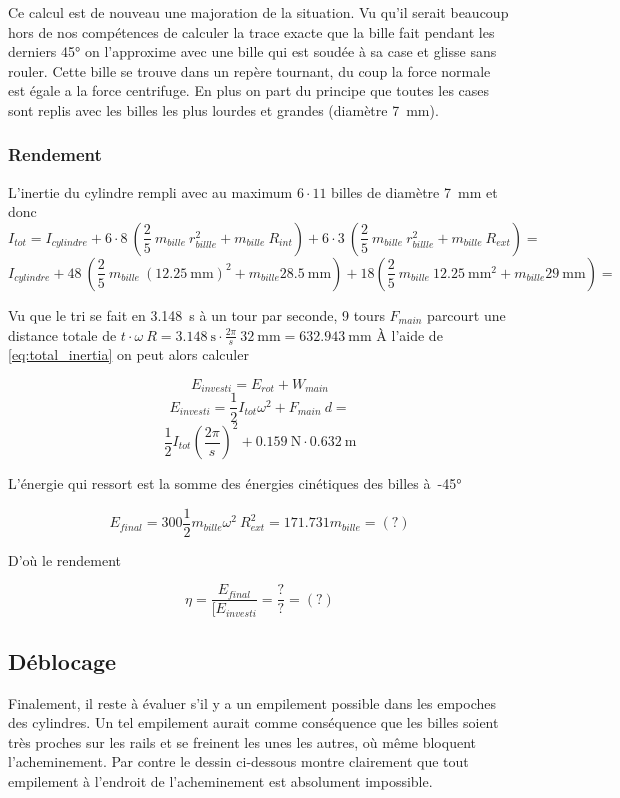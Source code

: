 Ce calcul est de nouveau une majoration de la situation. Vu qu'il serait beaucoup hors de nos compétences de calculer la trace exacte que la bille fait pendant les derniers \ang{45} on l'approxime avec une bille qui est soudée à sa case et glisse sans rouler. Cette bille se trouve dans un repère tournant, du coup la force normale est égale a la force centrifuge. En plus on part du principe que toutes les cases sont replis avec les billes les plus lourdes et grandes (diamètre \SI{7}{\milli\metre}).

\subsubsection{Rendement}
L'inertie du cylindre rempli avec au maximum $6 \cdot 11$ billes de diamètre \SI{7}{\milli\metre} et donc
    \[I_{tot} = I_{cylindre} + 6\cdot8 \ (\frac{2}{5} \ m_{bille} \ r_{billle}^{2} + m_{bille} \ R_{int}) + 6\cdot3 \ (\frac{2}{5} \ m_{bille} \ r_{billle}^{2} + m_{bille} \ R_{ext}) = \]
\begin{equation}    
    I_{cylindre} + 48\ (\frac{2}{5}\ m_{bille} \ (\SI{12.25}{\milli\metre})^{2} + m_{bille} \SI{28.5}{\milli\metre}) + 18 (\frac{2}{5} \ m_{bille} \ \SI{12.25}{\mm\squared} + m_{bille} \SI{29}{\milli\metre}) =
\label{eq:total_inertia}
\end{equation}

Vu que le tri se fait en \SI{3.148}{\s} à un tour par seconde, 9 tours $F_{main}$ parcourt une distance totale de $t \cdot \omega \ R = \SI{3.148}{\s}\cdot \frac{2\pi}{s}\ \SI{32}{\milli\metre} = \SI{632.943}{\milli\metre}$
À l'aide de \ref{eq:total_inertia} on peut alors calculer

\[E_{investi} = E_{rot} + W_{main}\]
\[E_{investi} = \frac{1}{2}I_{tot}\omega^{2} + F_{main} \ d = \]
\[\frac{1}{2}I_{tot}(\frac{2\pi}{s})^{2} + \SI{0.159}{\N}\cdot \SI{0.632}{\metre}\]
\[\]

L'énergie qui ressort est la somme des énergies cinétiques des billes à~\ang{-45}

\[E_{final} = 300 \frac{1}{2} m_{bille} \omega^{2} \ R_{ext}^{2} = 171.731 m_{bille} = (?)\]

D'où le rendement

\[\eta = \frac{E_{final}}{[E_{investi}} = \frac{?}{?} = (?)\]

\subsection{Déblocage}
Finalement, il reste à évaluer s'il y a un empilement possible dans les empoches des cylindres. Un tel empilement aurait comme conséquence que les billes soient très proches sur les rails et se freinent les unes les autres, où même bloquent l'acheminement. Par contre le dessin ci-dessous montre clairement que tout empilement à l'endroit de l'acheminement est absolument impossible.
